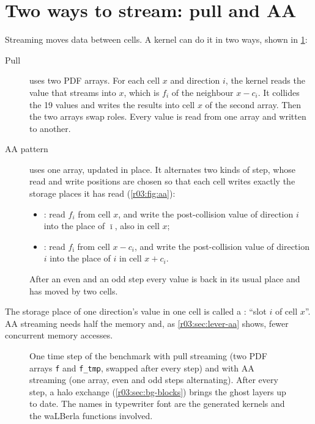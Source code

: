 \section{Two ways to stream: pull and AA}\label{r03:sec:bg-stream}

Streaming moves data between cells. A kernel can do it in two ways, shown in
\cref{r03:fig:timestep}:
\begin{description}
  \item[Pull] uses two PDF arrays. For each cell $x$ and direction $i$, the kernel reads the
        value that streams into $x$, which is $f_i$ of the neighbour $x - c_i$. It collides
        the 19 values and writes the results into cell $x$ of the second array. Then the two
        arrays swap roles. Every value is read from one array and written to another.
  \item[AA pattern] \autocite{bailey-aa} uses one array, updated in place. It alternates two
        kinds of step, whose read and write positions are chosen so that each cell writes
        exactly the storage places it has read (\cref{r03:fig:aa}):
        \begin{itemize}
          \item {}: read $f_i$ from cell $x$, and write the post-collision value
                of direction $i$ into the place of $\bar\imath$, also in cell $x$;
          \item {}: read $f_{\bar\imath}$ from cell $x - c_i$, and write the
                post-collision value of direction $i$ into the place of $i$ in cell
                $x + c_i$.
        \end{itemize}
        After an even and an odd step every value is back in its usual place and has moved
        by two cells.
\end{description}
The storage place of one direction's value in one cell is called a : ``slot $i$
of cell $x$''. AA streaming needs half the memory and, as \cref{r03:sec:lever-aa} shows,
fewer concurrent memory accesses.

\begin{figure}[htbp]
  \centering
  \resizebox{\linewidth}{!}{}
  \caption[One time step with pull and with AA streaming]{One time step of the benchmark with
    pull streaming (two PDF arrays \texttt{f} and \texttt{f\_tmp}, swapped after every step)
    and with AA streaming (one array, even and odd steps alternating). After every step, a
    halo exchange (\cref{r03:sec:bg-blocks}) brings the ghost layers up to date. The names
    in typewriter font are the generated kernels and the waLBerla functions involved.}\label{r03:fig:timestep}
\end{figure}

